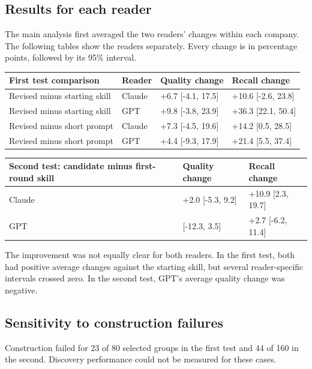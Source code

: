 \documentclass[11pt]{article}
\begin{document}
\subsection{Results for each reader}
The main analysis first averaged the two readers' changes within each company. The following tables show the readers separately. Every change is in percentage points, followed by its 95\% interval.

\begin{center}
\small
\setlength{\tabcolsep}{4pt}
\renewcommand{\arraystretch}{1.25}
\begin{tabularx}{\linewidth}{@{}>{\raggedright\arraybackslash}X>{\raggedright\arraybackslash}X>{\raggedright\arraybackslash}X>{\raggedright\arraybackslash}X@{}}
\toprule
\textbf{First test comparison} & \textbf{Reader} & \textbf{Quality change} & \textbf{Recall change} \\
\midrule
Revised minus starting skill & Claude & +6.7 [-4.1, 17.5] & +10.6 [-2.6, 23.8] \\
Revised minus starting skill & GPT & +9.8 [-3.8, 23.9] & +36.3 [22.1, 50.4] \\
Revised minus short prompt & Claude & +7.3 [-4.5, 19.6] & +14.2 [0.5, 28.5] \\
Revised minus short prompt & GPT & +4.4 [-9.3, 17.9] & +21.4 [5.5, 37.4] \\
\bottomrule
\end{tabularx}
\end{center}
\begin{center}
\small
\setlength{\tabcolsep}{4pt}
\renewcommand{\arraystretch}{1.25}
\begin{tabularx}{\linewidth}{@{}>{\raggedright\arraybackslash}X>{\raggedright\arraybackslash}X>{\raggedright\arraybackslash}X@{}}
\toprule
\textbf{Second test: candidate minus first-round skill} & \textbf{Quality change} & \textbf{Recall change} \\
\midrule
Claude & +2.0 [-5.3, 9.2] & +10.9 [2.3, 19.7] \\
GPT & -4.4 [-12.3, 3.5] & +2.7 [-6.2, 11.4] \\
\bottomrule
\end{tabularx}
\end{center}
The improvement was not equally clear for both readers. In the first test, both had positive average changes against the starting skill, but several reader-specific intervals crossed zero. In the second test, GPT's average quality change was negative.

\subsection{Sensitivity to construction failures}
Construction failed for 23 of 80 selected groups in the first test and 44 of 160 in the second. Discovery performance could not be measured for these cases.
\end{document}
